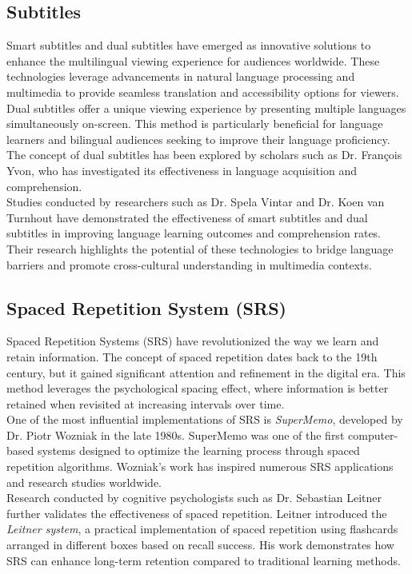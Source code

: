 \documentclass[12pt]{article}
\begin{document}
\subsection{Subtitles}
Smart subtitles and dual subtitles have emerged as innovative solutions to enhance the multilingual viewing experience for audiences worldwide. These technologies leverage advancements in natural language processing and multimedia to provide seamless translation and accessibility options for viewers. \\
Dual subtitles offer a unique viewing experience by presenting multiple languages simultaneously on-screen. This method is particularly beneficial for language learners and bilingual audiences seeking to improve their language proficiency. The concept of dual subtitles has been explored by scholars such as Dr. François Yvon, who has investigated its effectiveness in language acquisition and comprehension.\\
Studies conducted by researchers such as Dr. Spela Vintar and Dr. Koen van Turnhout have demonstrated the effectiveness of smart subtitles and dual subtitles in improving language learning outcomes and comprehension rates. Their research highlights the potential of these technologies to bridge language barriers and promote cross-cultural understanding in multimedia contexts.\\

\subsection{Spaced Repetition System (SRS)}
Spaced Repetition Systems (SRS) have revolutionized the way we learn and retain information. The concept of spaced repetition dates back to the 19th century, but it gained significant attention and refinement in the digital era. This method leverages the psychological spacing effect, where information is better retained when revisited at increasing intervals over time. \\
One of the most influential implementations of SRS is \textit{SuperMemo}, developed by Dr. Piotr Wozniak in the late 1980s. SuperMemo was one of the first computer-based systems designed to optimize the learning process through spaced repetition algorithms. Wozniak's work has inspired numerous SRS applications and research studies worldwide.\\
Research conducted by cognitive psychologists such as Dr. Sebastian Leitner further validates the effectiveness of spaced repetition. Leitner introduced the \textit{Leitner system}, a practical implementation of spaced repetition using flashcards arranged in different boxes based on recall success. His work demonstrates how SRS can enhance long-term retention compared to traditional learning methods.\\
\end{document}
